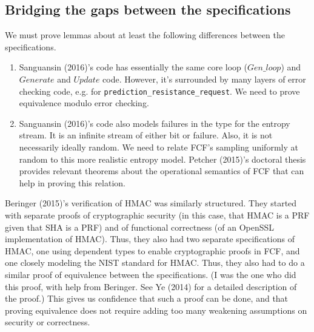 \documentclass[12pt,lot, lof]{puthesis}
\newcommand{\li} {\lstinline}
\begin{document}
{%

\subsection{Bridging the gaps between the specifications}

We must prove lemmas about at least the following differences between the specifications.

\begin{enumerate}
\item Sanguansin (2016)'s code has essentially the same core loop ($Gen\_loop$) and $Generate$ and $Update$ code. However, it's surrounded by many layers of error checking code, e.g. for \li|prediction_resistance_request|. We need to prove equivalence modulo error checking.
\item Sanguansin (2016)'s code also models failures in the type for the entropy stream. It is an infinite stream of either bit or failure. Also, it is not necessarily ideally random. We need to relate FCF's sampling uniformly at random to this more realistic entropy model. Petcher (2015)'s doctoral thesis provides relevant theorems about the operational semantics of FCF that can help in proving this relation.
\end{enumerate}

Beringer (2015)'s verification of HMAC was similarly structured. They started with separate proofs of cryptographic security (in this case, that HMAC is a PRF given that SHA is a PRF) and of functional correctness (of an OpenSSL implementation of HMAC). Thus, they also had two separate specifications of HMAC, one using dependent types to enable cryptographic proofs in FCF, and one closely modeling the NIST standard for HMAC. Thus, they also had to do a similar proof of equivalence between the specifications. (I was the one who did this proof, with help from Beringer. See Ye (2014) for a detailed description of the proof.) This gives us confidence that such a proof can be done, and that proving equivalence does not require adding too many weakening assumptions on security or correctness. 

}
\end{document}

